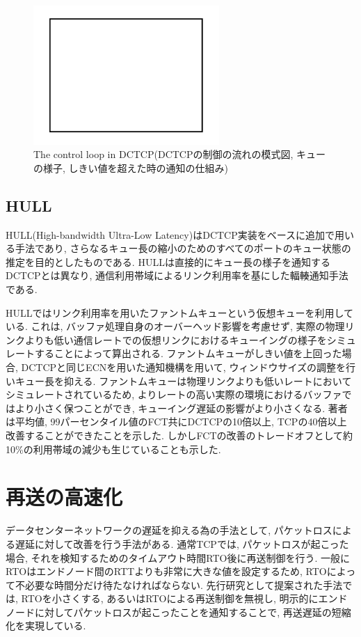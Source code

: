 \begin{figure}[t]
    \begin{center}
    \includegraphics[autoebb, width=200pt]{./img/test.pdf}
    \caption{The control loop in DCTCP(DCTCPの制御の流れの模式図, キューの様子,
    しきい値を超えた時の通知の仕組み)}
    \label{fig:dctcp_control}
    \end{center}
\end{figure}

\subsection{HULL}
HULL(High-bandwidth Ultra-Low Latency)\cite{hull}はDCTCP実装をベースに追加で用いる手法であり,
さらなるキュー長の縮小のためのすべてのポートのキュー状態の推定を目的としたものである. 
HULLは直接的にキュー長の様子を通知するDCTCPとは異なり, 通信利用帯域によるリンク利用率を基にした輻輳通知手法である. 

HULLではリンク利用率を用いたファントムキューという仮想キューを利用している. 
これは, バッファ処理自身のオーバーヘッド影響を考慮せず,
実際の物理リンクよりも低い通信レートでの仮想リンクにおけるキューイングの様子をシミュレートすることによって算出される. 
ファントムキューがしきい値を上回った場合, DCTCPと同じECNを用いた通知機構を用いて, ウィンドウサイズの調整を行いキュー長を抑える. 
ファントムキューは物理リンクよりも低いレートにおいてシミュレートされているため, よりレートの高い実際の環境におけるバッファではより小さく保つことができ,
キューイング遅延の影響がより小さくなる. 
著者は平均値, 99パーセンタイル値のFCT共にDCTCPの10倍以上, TCPの40倍以上改善することができたことを示した. 
しかしFCTの改善のトレードオフとして約10\%の利用帯域の減少も生じていることも示した. 

\section{再送の高速化}
データセンターネットワークの遅延を抑える為の手法として, パケットロスによる遅延に対して改善を行う手法がある. 
通常TCPでは, パケットロスが起こった場合, それを検知するためのタイムアウト時間RTO後に再送制御を行う. 
一般にRTOはエンドノード間のRTTよりも非常に大きな値を設定するため, RTOによって不必要な時間分だけ待たなければならない. 
先行研究として提案された手法では, RTOを小さくする, あるいはRTOによる再送制御を無視し,
明示的にエンドノードに対してパケットロスが起こったことを通知することで, 再送遅延の短縮化を実現している. 

